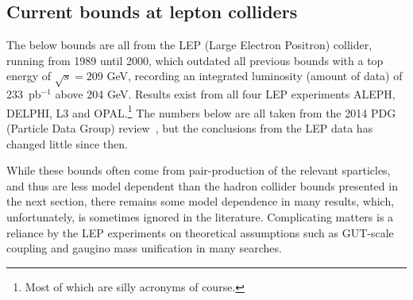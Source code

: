 \documentclass[notes.tex]{subfiles}
\begin{document}
\subsection{Current bounds at lepton colliders}
The below bounds are all from the LEP (Large Electron Positron) collider, running from 1989 until 2000, which outdated all previous bounds with a top energy of $\sqrt{s}=209$ GeV, recording an integrated luminosity (amount of data) of 233~pb$^{-1}$ above 204 GeV. Results exist from all four LEP experiments ALEPH, DELPHI, L3 and OPAL.\footnote{Most of which are silly acronyms of course.} The numbers below are all taken from the 2014 PDG (Particle Data Group) review~\cite{Agashe:2014kda}, but the conclusions from the LEP data has changed little since then. 

While these bounds often come from pair-production of the relevant sparticles, and thus are less model dependent than the hadron collider bounds presented in the next section, there remains some model dependence in many results, which, unfortunately, is sometimes ignored in the literature. Complicating matters is a reliance by the LEP experiments on theoretical assumptions such as GUT-scale coupling and gaugino mass unification in many searches.
\end{document}
